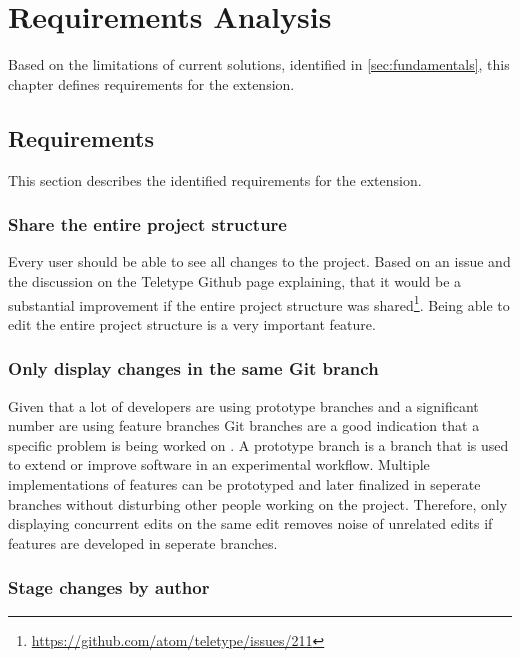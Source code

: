 \chapter{Requirements Analysis}

Based on the limitations of current solutions, identified in \autoref{sec:fundamentals}, this chapter defines requirements for the extension.

\section{Requirements}

This section describes the identified requirements for the extension.

\subsection{Share the entire project structure}

Every user should be able to see all changes to the project.
Based on an issue and the discussion on the Teletype Github page explaining, that it would be a substantial improvement if the entire project structure was shared\footnote{\href{https://github.com/atom/teletype/issues/211}{https://github.com/atom/teletype/issues/211}}. Being able to edit the entire project structure is a very important feature.

\subsection{Only display changes in the same Git branch}

Given that a lot of developers are using prototype branches and a significant number are using feature branches Git branches are a good indication that a specific problem is being worked on \cite{PhillipsSillitoWalker:2011:Branching_and_merging}. A prototype branch is a branch that is used to extend or improve software in an experimental workflow. Multiple implementations of features can be prototyped and later finalized in seperate branches without disturbing other people working on the project. Therefore, only displaying concurrent edits on the same edit removes noise of unrelated edits if features are developed in seperate branches. 

\subsection{Stage changes by author}

